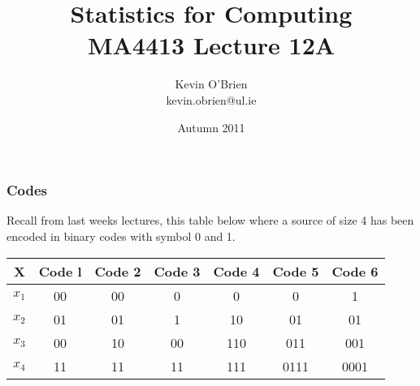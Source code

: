 \documentclass[a4]{beamer}
\title[MA4413]{Statistics for Computing \\ {\normalsize MA4413 Lecture 12A}}
\author[Kevin O'Brien]{Kevin O'Brien \\ {\scriptsize kevin.obrien@ul.ie}}
\date{Autumn 2011}
\institute[Maths \& Stats]{Dept. of Mathematics \& Statistics, \\ University \textit{of} Limerick}
\begin{document}
\begin{frame}
\frametitle{Codes}
Recall from last weeks lectures, this table below where a source of
size 4 has been encoded in binary codes with symbol 0 and 1.\\ \bigskip
\begin{center}
\begin{tabular}{|c| c| c| c| c| c| c|}
\hline
X& Code l& Code 2& Code 3 &Code 4& Code 5& Code 6\\\hline
$x_1$& 00& 00 &0 &0 &0 &1\\
$x_2$& 01& 01 &1 &10 &01 &01\\
$x_3$ &00 &10& 00& 110& 011 &001\\
$x_4$ &11& 11& 11& 111 &0111 &0001\\\hline
\end{tabular}
\end{center}
\end{frame}
\end{document}
